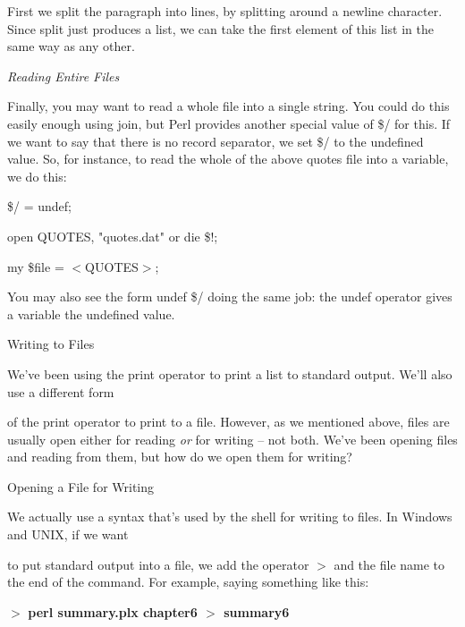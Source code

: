 \documentclass[a4paper,11pt]{book}
\begin{document}
\noindent First we split the paragraph into lines, by splitting around a newline character. Since split just produces a list, we can take the first element of this list in the same way as any other.

\noindent 

\noindent \textit{Reading Entire Files}

\noindent Finally, you may want to read a whole file into a single string. You could do this easily enough using join, but Perl provides another special value of \$/ for this. If we want to say that there is no record separator, we set \$/ to the undefined value. So, for instance, to read the whole of the above quotes file into a variable, we do this:

\noindent 

\noindent 

\noindent \$/ = undef;

\noindent open QUOTES, "quotes.dat" or die \$!;

\noindent my \$file = $<$QUOTES$>$;

\noindent 

\noindent You may also see the form undef \$/ doing the same job: the undef operator gives a variable the undefined value.

\noindent 

\noindent 

\noindent Writing to Files

\noindent 

\noindent We've been using the print operator to print a list to standard output. We'll also use a different form

\noindent of the print operator to print to a file. However, as we mentioned above, files are usually open either for reading \textit{or }for writing -- not both. We've been opening files and reading from them, but how do we open them for writing?

\noindent 

\noindent Opening a File for Writing

\noindent 

\noindent We actually use a syntax that's used by the shell for writing to files. In Windows and UNIX, if we want

\noindent to put standard output into a file, we add the operator \textbf{$>$ }and the file name to the end of the command. For example, saying something like this:

\noindent 

\noindent $>$ \textbf{perl summary.plx chapter6 $>$ summary6}
\end{document}
